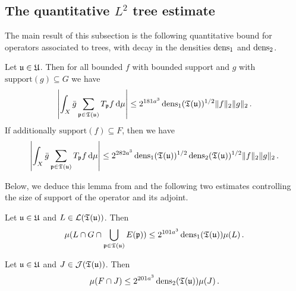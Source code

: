 \subsection{The quantitative \texorpdfstring{$L^2$}{L2} tree estimate}

The main result of this subsection is the following quantitative bound for operators associated to trees, with decay in the densities $\operatorname{\operatorname{dens}}_1$ and $\operatorname{\operatorname{dens}}_2$.

\begin{lemma}
    \label{densities-tree-bound}
    \leanok
    Let ${\mathfrak u} \in {\mathfrak U}$. Then for all bounded $f$ with bounded support and $g$ with $\text{support}(g) \subseteq G$
    we have
    \begin{equation}
        \label{eq-cor-tree-est}
        \left|\int_X \bar g \sum_{{\mathfrak p} \in {\mathfrak T}({\mathfrak u})} T_{{\mathfrak p} }f \, \mathrm{d}\mu \right| \le 2^{181a^3} \operatorname{\operatorname{dens}}_1({\mathfrak T}({\mathfrak u}))^{1/2} \|f\|_2\|g\|_2\,.
    \end{equation}
    If additionally $\text{support}(f) \subseteq F$, then we have
    \begin{equation}
        \label{eq-cor-tree-est-F}
        \left| \int_X \bar g \sum_{{\mathfrak p} \in {\mathfrak T}({\mathfrak u})} T_{{\mathfrak p} }f\, \mathrm{d}\mu \right| \le 2^{282a^3} \operatorname{\operatorname{dens}}_1({\mathfrak T}({\mathfrak u}))^{1/2} \operatorname{\operatorname{dens}}_2({\mathfrak T}({\mathfrak u}))^{1/2} \|f\|_2\|g\|_2\,.
    \end{equation}
\end{lemma}

Below, we deduce this lemma from  and the following two estimates controlling the size of support of the operator and its adjoint.

\begin{lemma}
    \label{local-dens1-tree-bound}
    \leanok
    Let ${\mathfrak u} \in {\mathfrak U}$ and $L \in \mathcal{L}({\mathfrak T}({\mathfrak u}))$. Then
    \begin{equation}
    \label{eq-1density-estimate-tree}
        \mu(L \cap G \cap \bigcup_{{\mathfrak p} \in {\mathfrak T}({\mathfrak u})} E({\mathfrak p})) \le 2^{101a^3} \operatorname{\operatorname{dens}}_1({\mathfrak T}({\mathfrak u})) \mu(L)\,.
    \end{equation}
\end{lemma}

\begin{lemma}
    \label{local-dens2-tree-bound}
    \leanok
    Let ${\mathfrak u} \in {\mathfrak U}$ and $J \in \mathcal{J}({\mathfrak T}({\mathfrak u}))$. Then
    $$
        \mu(F \cap J) \le 2^{201a^3} \operatorname{\operatorname{dens}}_2({\mathfrak T}({\mathfrak u})) \mu(J)\,.
    $$
\end{lemma}

